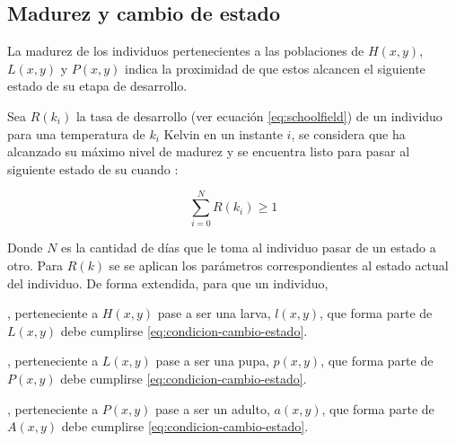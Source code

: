 \subsection{Madurez y cambio de estado}
\label{subsec:cap4-madurez-cambio-estado}
La madurez de los individuos pertenecientes a las poblaciones de $H(x,y)$, $L(x,y)$ y $P(x,y)$
indica la proximidad de que estos alcancen el siguiente estado de su etapa de desarrollo.

Sea $R(k_{i})$ la tasa de desarrollo (ver ecuación \eqref{eq:schoolfield}) de un individuo para
una temperatura de $k_{i}$ Kelvin en un instante $i$, se considera que ha alcanzado su máximo nivel
de madurez y se encuentra listo para pasar al siguiente estado de su cuando :

\begin{equation}
\label{eq:condicion-cambio-estado}
    \sum_{i=0}^{N} R(k_{i}) \geq 1
\end{equation}

Donde $N$ es la cantidad de días que le toma al individuo pasar de un estado a otro. Para $R(k)$ se
se aplican los parámetros correspondientes al estado actual del individuo. De forma extendida,
para que un individuo,

\begin{description}[style=multiline,leftmargin=1.5cm]
\item[$h(x,y)$], perteneciente a $H(x,y)$ pase a ser una larva, $l(x,y)$, que forma
parte de $L(x,y)$ debe cumplirse \eqref{eq:condicion-cambio-estado}.

\item[$l(x,y)$], perteneciente a $L(x,y)$ pase a ser una pupa, $p(x,y)$, que forma
parte de $P(x,y)$ debe cumplirse \eqref{eq:condicion-cambio-estado}.

\item[$p(x,y)$], perteneciente a $P(x,y)$ pase a ser un adulto, $a(x,y)$, que forma
parte de $A(x,y)$ debe cumplirse \eqref{eq:condicion-cambio-estado}.
\end{description}




